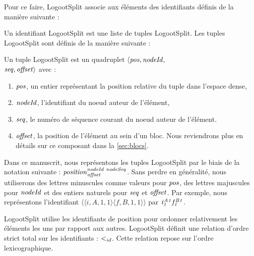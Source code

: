 Pour ce faire, LogootSplit associe aux éléments des identifiants définis de la manière suivante :

\begin{definition}
  Un identifiant LogootSplit est une liste de tuples LogootSplit.
  Les tuples LogootSplit sont définis de la manière suivante :
  \begin{subdefinition}
    Un tuple LogootSplit est un quadruplet $\langle \mathit{pos},\mathit{nodeId},$ \\
    $\mathit{seq},\mathit{offset} \rangle$ avec :
    \begin{enumerate}
      \item $\mathit{pos}$, un entier représentant la position relative du tuple dans l'espace dense,
      \item $\mathit{nodeId}$, l'identifiant du noeud auteur de l'élément,
      \item $\mathit{seq}$, le numéro de séquence courant du noeud auteur de l'élément.
      \item $\mathit{offset}$, la position de l'élément au sein d'un bloc. Nous reviendrons plus en détails sur ce composant dans la \autoref{sec:blocs}.
    \end{enumerate}
  \end{subdefinition}
\end{definition}

Dans ce manuscrit, nous représentons les tuples LogootSplit par le biais de la notation suivante : $\mathit{position}^{\mathit{nodeId~nodeSeq}}_{\mathit{offset}}$.
Sans perdre en généralité, nous utiliserons des lettres minuscules comme valeurs pour $\mathit{pos}$, des lettres majuscules pour $\mathit{nodeId}$ et des entiers naturels pour $\mathit{seq}$ et $\mathit{offset}$.
Par exemple, nous représentons l'identifiant $\langle \langle i,A,1,1 \rangle \langle f,B,1,1 \rangle \rangle$ par $\mathit{i}^{\mathit{A1}}_{\mathit{1}}\mathit{f}^{\mathit{B1}}_{\mathit{1}}$.

LogootSplit utilise les identifiants de position pour ordonner relativement les éléments les uns par rapport aux autres.
LogootSplit définit une relation d'ordre strict total sur les identifiants : $<_{id}$.
Cette relation repose sur l'ordre lexicographique.

